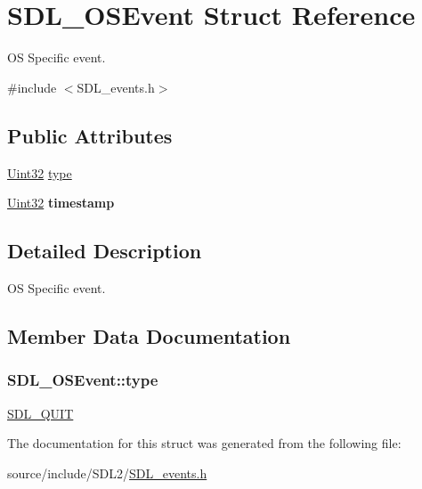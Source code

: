 \hypertarget{struct_s_d_l___o_s_event}{}\section{S\+D\+L\+\_\+\+O\+S\+Event Struct Reference}
\label{struct_s_d_l___o_s_event}


O\+S Specific event.  




{\ttfamily \#include $<$S\+D\+L\+\_\+events.\+h$>$}

\subsection*{Public Attributes}
\begin{DoxyCompactItemize}
\item 
\hyperlink{_s_d_l__stdinc_8h_add440eff171ea5f55cb00c4a9ab8672d}{Uint32} \hyperlink{struct_s_d_l___o_s_event_a85a600619ebebc8db007fc757b3895a5}{type}
\item 
\hypertarget{struct_s_d_l___o_s_event_a8b2480eefadad9f3f8c94f8e550b7fb0}{}\hyperlink{_s_d_l__stdinc_8h_add440eff171ea5f55cb00c4a9ab8672d}{Uint32} {\bfseries timestamp}\label{struct_s_d_l___o_s_event_a8b2480eefadad9f3f8c94f8e550b7fb0}

\end{DoxyCompactItemize}


\subsection{Detailed Description}
O\+S Specific event. 

\subsection{Member Data Documentation}
\hypertarget{struct_s_d_l___o_s_event_a85a600619ebebc8db007fc757b3895a5}{}
\subsubsection[{type}]{ S\+D\+L\+\_\+\+O\+S\+Event\+::type}\label{struct_s_d_l___o_s_event_a85a600619ebebc8db007fc757b3895a5}
\hyperlink{_s_d_l__events_8h_a3b589e89be6b35c02e0dd34a55f3fccaa31acc5fdafc86ebe2c1f5c3cae48d603}{S\+D\+L\+\_\+\+Q\+U\+I\+T} 

The documentation for this struct was generated from the following file\+:\begin{DoxyCompactItemize}
\item 
source/include/\+S\+D\+L2/\hyperlink{_s_d_l__events_8h}{S\+D\+L\+\_\+events.\+h}\end{DoxyCompactItemize}
